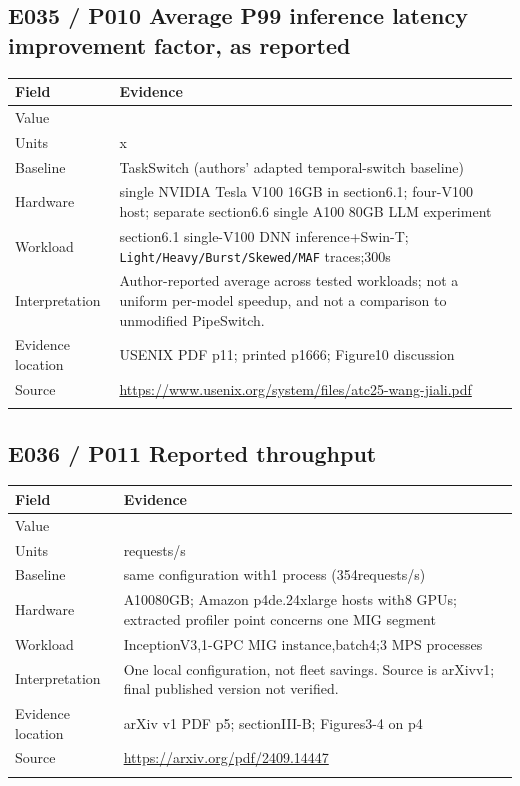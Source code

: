 \subsection*{E035 / P010 Average P99 inference latency improvement factor, as reported}

\begin{longtable}{>{\raggedright\arraybackslash}p{}>{\raggedright\arraybackslash}p{}}
\toprule
\textbf{Field} & \textbf{Evidence}\\\midrule\endhead
Value & 12.6\\\addlinespace
Units & x\\\addlinespace
Baseline & TaskSwitch (authors' adapted temporal-switch baseline)\\\addlinespace
Hardware & single NVIDIA Tesla V100 16GB in section6.1; four-V100 host; separate section6.6 single A100 80GB LLM experiment\\\addlinespace
Workload & section6.1 single-V100 DNN inference+Swin-T; \nolinkurl{Light/Heavy/Burst/Skewed/MAF} traces;300s\\\addlinespace
Interpretation & Author-reported average across tested workloads; not a uniform per-model speedup, and not a comparison to unmodified PipeSwitch.\\\addlinespace
Evidence location & USENIX PDF p11; printed p1666; Figure10 discussion\\\addlinespace
Source & \url{https://www.usenix.org/system/files/atc25-wang-jiali.pdf}\\\addlinespace
\bottomrule\end{longtable}

\subsection*{E036 / P011 Reported throughput}

\begin{longtable}{>{\raggedright\arraybackslash}p{}>{\raggedright\arraybackslash}p{}}
\toprule
\textbf{Field} & \textbf{Evidence}\\\midrule\endhead
Value & 446\\\addlinespace
Units & requests/s\\\addlinespace
Baseline & same configuration with1 process (354requests/s)\\\addlinespace
Hardware & A10080GB; Amazon p4de.24xlarge hosts with8 GPUs; extracted profiler point concerns one MIG segment\\\addlinespace
Workload & InceptionV3,1-GPC MIG instance,batch4;3 MPS processes\\\addlinespace
Interpretation & One local configuration, not fleet savings. Source is arXivv1; final published version not verified.\\\addlinespace
Evidence location & arXiv v1 PDF p5; sectionIII-B; Figures3-4 on p4\\\addlinespace
Source & \url{https://arxiv.org/pdf/2409.14447}\\\addlinespace
\bottomrule\end{longtable}

